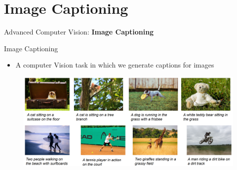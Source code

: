 \section{Image Captioning}
\begin{frame}{}
    \LARGE Advanced Computer Vision: \textbf{Image Captioning}
\end{frame}

\begin{frame}[allowframebreaks]{Image Captioning}
    \begin{itemize}
        \item A computer Vision task in which we generate captions for images
    \end{itemize}
    \begin{figure}
    \centering
    \includegraphics[width=1.0\textwidth,height=1.0\textheight,keepaspectratio]{images/advanced-cv/cap_1.png}
    \end{figure} 


\end{frame}
